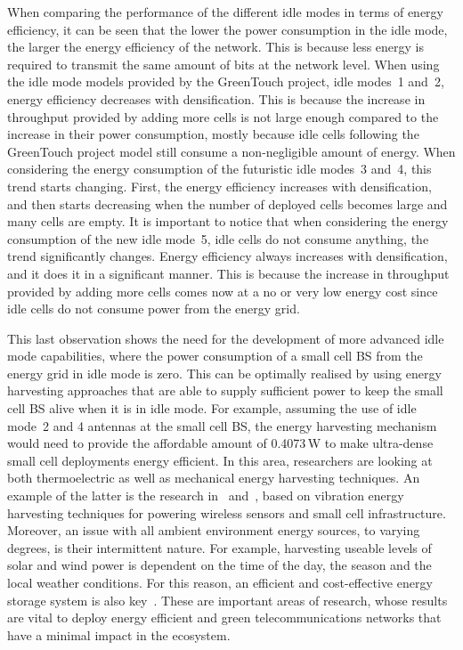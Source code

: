 \documentclass{IEEEtran}
\begin{document}
When comparing the performance of the different idle modes in terms of energy efficiency,
it can be seen that
the lower the power consumption in the idle mode,
the larger the energy efficiency of the network.
This is because less energy is required to transmit the same amount of bits at the network level.
When using the idle mode models provided by the GreenTouch project,
idle modes~1 and~2,
energy efficiency decreases with densification.
This is because the increase in throughput provided by adding more cells is not large enough compared to the increase in their power consumption,
mostly because idle cells following the GreenTouch project model still consume a non-negligible amount of energy.
When considering the energy consumption of the futuristic idle modes~3 and~4,
this trend starts changing.
First, the energy efficiency increases with densification,
and then starts decreasing when the number of deployed cells becomes large and many cells are empty.
It is important to notice that when considering the energy consumption of the new idle mode~5,
idle cells do not consume anything,
the trend significantly changes.
Energy efficiency always increases with densification,
and it does it in a significant manner.
This is because the increase in throughput provided by adding more cells comes now at a no or very low energy cost
since idle cells do not consume power from the energy grid.

This last observation shows the need for the development of more advanced idle mode capabilities,
where the power consumption of a small cell \ac{BS} from the energy grid in idle mode is zero.
This can be optimally realised by using energy harvesting approaches
that are able to supply sufficient power to keep the small cell \ac{BS} alive when it is in idle mode.
For example, assuming the use of idle mode~2 and 4 antennas at the small cell BS,
the energy harvesting mechanism would need to provide the affordable amount of 0.4073\,W
to make ultra-dense small cell deployments energy efficient.
In this area, researchers are looking at both thermoelectric as well as mechanical energy harvesting techniques.
An example of the latter is the research in~\cite{ODonoghue2014a} and~\cite{Nico2014a},
based on vibration energy harvesting techniques for powering wireless sensors and small cell infrastructure.
Moreover, an issue with all ambient environment energy sources, to varying degrees, is their intermittent nature.
For example, harvesting useable levels of solar and wind power is dependent on the time of the day, the season and the local weather conditions.
For this reason, an efficient and cost-effective energy storage system is also key~\cite{Divya2009}.
These are important areas of research,
whose results are vital to deploy energy efficient and green telecommunications networks that have a minimal impact in the ecosystem.
\end{document}
